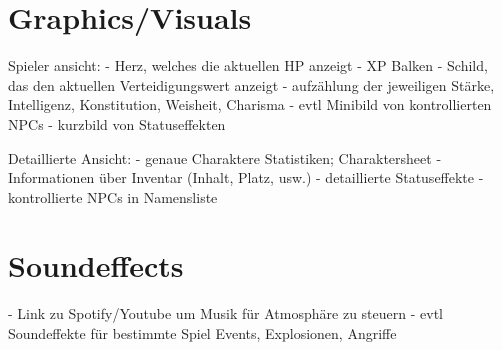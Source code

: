 \documentclass[11pt]{article}
\begin{document}
    \section{Graphics/Visuals}\label{sec:graphics/visuals}
    Spieler ansicht:
    - Herz, welches die aktuellen HP anzeigt
    - XP Balken
    - Schild, das den aktuellen Verteidigungswert anzeigt
    - aufzählung der jeweiligen Stärke, Intelligenz, Konstitution, Weisheit, Charisma
    - evtl Minibild von kontrollierten NPCs
    - kurzbild von Statuseffekten

    Detaillierte Ansicht:
    - genaue Charaktere Statistiken; Charaktersheet
    - Informationen über Inventar (Inhalt, Platz, usw.)
    - detaillierte Statuseffekte
    - kontrollierte NPCs in Namensliste

    \section{Soundeffects}\label{sec:soundeffects}
    - Link zu Spotify/Youtube um Musik für Atmosphäre zu steuern
    - evtl Soundeffekte für bestimmte Spiel Events, Explosionen, Angriffe
\end{document}
